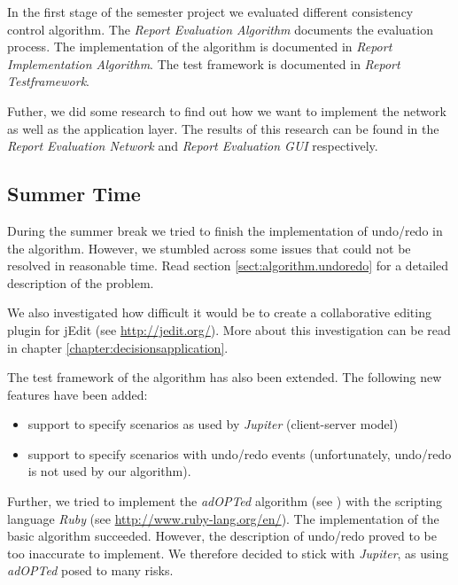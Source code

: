 In the first stage of the semester project we evaluated different
consistency control algorithm. The \emph{Report Evaluation Algorithm}
documents the evaluation process. The implementation of the
algorithm is documented in \emph{Report Implementation Algorithm}. The
test framework is documented in \emph{Report Testframework}.

Futher, we did some research to find out how we want to implement the
network as well as the application layer. The results of this research
can be found in the \emph{Report Evaluation Network} and 
\emph{Report Evaluation GUI} respectively.


\subsection{Summer Time}
During the summer break we tried to finish the implementation of undo/redo
in the algorithm. However, we stumbled across some issues that could not
be resolved in reasonable time. Read section \ref{sect:algorithm.undoredo} for
a detailed description of the problem.

We also investigated how difficult it would be to create a collaborative 
editing plugin for jEdit (see \href{http://jedit.org/}{http://jedit.org/}).
More about this investigation can be read in chapter 
\ref{chapter:decisionsapplication}.

The test framework of the algorithm has also been extended. The following 
new features have been added:
\begin{itemize}
 \item support to specify scenarios as used by \emph{Jupiter} (client-server model)
 \item support to specify scenarios with undo/redo events (unfortunately, undo/redo is not used by our algorithm).
\end{itemize}

Further, we tried to implement the \emph{adOPTed} algorithm (see 
\cite{ressel96}) with the scripting language \emph{Ruby} (see
\href{http://www.ruby-lang.org/en/}{http://www.ruby-lang.org/en/}). The
implementation of the basic algorithm succeeded. However, the description
of undo/redo proved to be too inaccurate to implement. We therefore 
decided to stick with \emph{Jupiter}, as using \emph{adOPTed} posed to many
risks.

